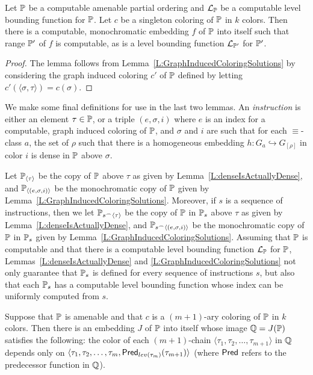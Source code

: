 \begin{lem}\label{L:nEquals1}
Let $\mathbb{P}$ be a computable amenable partial ordering and $\mathcal{L}_{\mathbb{P}}$ be a computable level bounding function for $\mathbb{P}$.
Let $c$ be a singleton coloring of $\mathbb{P}$ in $k$ colors.
Then there is a computable, monochromatic embedding $f$ of $\mathbb{P}$ into itself such that
range $\mathbb{P}'$ of $f$ is computable, as is a level bounding function $\mathcal{L}_{\mathbb{P}'}$ for $\mathbb{P}'$.
\end{lem}

\begin{proof}
The lemma follows from Lemma~\ref{L:GraphInducedColoringSolutions} by considering
the graph induced coloring $c'$ of $\mathbb{P}$ defined by letting $c'(\langle\sigma,\tau\rangle)=c(\sigma)$.
\end{proof}

We make some final definitions for use in the last two lemmas.
An \textit{instruction} is either an element $\tau\in\mathbb{P}$, or
a triple $(e,\sigma,i)$ where $e$ is an index for a computable,
graph induced coloring of $\mathbb{P}$, and $\sigma$ and $i$ are
such that for each $\equiv$-class $a$,
the set of $\rho$ such that there is a homogeneous embedding
$h:G_a\hookrightarrow G_{[\rho]}$ in color $i$ is dense in $\mathbb{P}$ above $\sigma$.

Let $\mathbb{P}_{\langle\tau\rangle}$ be the copy of $\mathbb{P}$ above $\tau$ as given
by Lemma~\ref{L:denseIsActuallyDense}, and
$\mathbb{P}_{\langle(e,\sigma,i)\rangle}$ be the monochromatic copy of $\mathbb{P}$
given by Lemma~\ref{L:GraphInducedColoringSolutions}.
Moreover, if $s$ is a sequence of instructions,
then we let $\mathbb{P}_{s^\frown\langle\tau\rangle}$ be the copy of $\mathbb{P}$ in $\mathbb{P}_{s}$
above $\tau$ as given by Lemma~\ref{L:denseIsActuallyDense},
and $\mathbb{P}_{s^\frown\langle(e,\sigma,i)\rangle}$ be the monochromatic copy of $\mathbb{P}$ in $\mathbb{P}_s$
given by Lemma~\ref{L:GraphInducedColoringSolutions}.
Assuming that $\mathbb{P}$ is computable and that there is a computable
level bounding function $\mathcal{L}_{\mathbb{P}}$ for $\mathbb{P}$,
Lemmas~\ref{L:denseIsActuallyDense} and \ref{L:GraphInducedColoringSolutions}
not only guarantee that $\mathbb{P}_s$ is defined for every sequence of instructions $s$,
but also that each $\mathbb{P}_s$ has a computable level bounding function
whose index can be uniformly computed from $s$.

\begin{lem}[ACA$_0$]\label{L:reduceHalfDimension}
Suppose that $\mathbb{P}$ is amenable and that $c$ is a $(m+1)$-ary coloring of $\mathbb{P}$ in $k$ colors.
Then there is an embedding $J$ of $\mathbb{P}$ into itself whose image $\mathbb{Q}=J(\mathbb{P})$
satisfies the following:
the color of each $(m+1)$-chain
$\langle \tau_1,\tau_2,\ldots,\tau_{m+1}\rangle$ in $\mathbb{Q}$ depends only on
$\langle \tau_1,\tau_2,\ldots,\tau_m,\mathsf{Pred}_{lev(\tau_m)}(\tau_{m+1})\rangle$
(where $\mathsf{Pred}$ refers to the predecessor function in $\mathbb{Q}$).
\end{lem}

